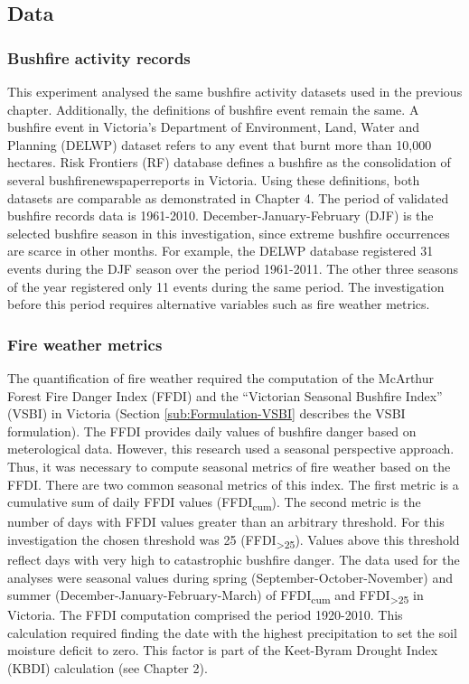 \subsection{Data}


\subsubsection{Bushfire activity records}

This experiment analysed the same bushfire activity datasets used
in the previous chapter. Additionally, the definitions of bushfire
event remain the same. A bushfire event in Victoria's Department of
Environment, Land, Water and Planning (DELWP) dataset refers to any
event that burnt more than 10,000 hectares. Risk Frontiers (RF) database
defines a bushfire as the consolidation of several bushfire\textemdash newspaper\textemdash reports
in Victoria. Using these definitions, both datasets are comparable
as demonstrated in Chapter 4. The period of validated bushfire records
data is 1961-2010. December-January-February (DJF) is the selected
bushfire season in this investigation, since extreme bushfire occurrences
are scarce in other months. For example, the DELWP database registered
31 events during the DJF season over the period 1961-2011. The other
three seasons of the year registered only 11 events during the same
period. The investigation before this period requires alternative
variables such as fire weather metrics. 


\subsubsection{Fire weather metrics}

The quantification of fire weather required the computation of the
McArthur Forest Fire Danger Index (FFDI) and the ``Victorian Seasonal
Bushfire Index'' (VSBI) in Victoria (Section \ref{sub:Formulation-VSBI}
describes the VSBI formulation). The FFDI provides daily values of
bushfire danger based on meterological data. However, this research
used a seasonal perspective approach. Thus, it was necessary to compute
seasonal metrics of fire weather based on the FFDI. There are two
common seasonal metrics of this index. The first metric is a cumulative
sum of daily FFDI values (FFDI\textsubscript{cum}). The second metric
is the number of days with FFDI values greater than an arbitrary threshold.
For this investigation the chosen threshold was 25 (FFDI\textsubscript{>25}).
Values above this threshold reflect days with very high to catastrophic
bushfire danger. The data used for the analyses were seasonal values
during spring (September-October-November) and summer (December-January-February-March)
of FFDI\textsubscript{cum} and FFDI\textsubscript{>25} in Victoria.
The FFDI computation comprised the period 1920-2010. This calculation
required finding the date with the highest precipitation to set the
soil moisture deficit to zero. This factor is part of the Keet-Byram
Drought Index (KBDI) calculation \citep{KeetchJJ} (see Chapter 2). 

